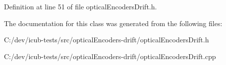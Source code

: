 Definition at line 51 of file optical\+Encoders\+Drift.\+h.



The documentation for this class was generated from the following files\+:\begin{DoxyCompactItemize}
\item 
C\+:/dev/icub-\/tests/src/optical\+Encoders-\/drift/optical\+Encoders\+Drift.\+h\item 
C\+:/dev/icub-\/tests/src/optical\+Encoders-\/drift/optical\+Encoders\+Drift.\+cpp\end{DoxyCompactItemize}
